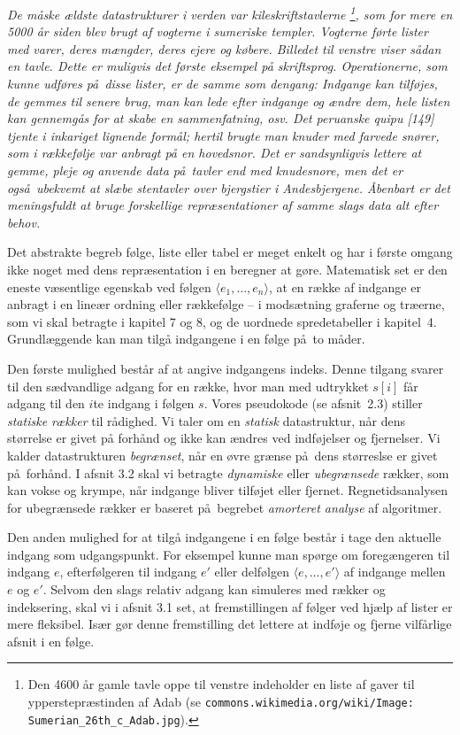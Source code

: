 \emph{De måske ældste datastrukturer i verden var kileskriftstavlerne%
\footnote{%
Den 4600 år gamle tavle oppe til venstre indeholder en liste af gaver til ypperstepræstinden af Adab (se \texttt{commons.wikimedia.org/wiki/Image: Sumerian\_26th\_c\_Adab.jpg}).
},
som for mere en 5000 år siden blev brugt af vogterne i sumeriske templer.
Vogterne førte lister med varer, deres mængder, deres ejere og købere.
Billedet til venstre viser sådan en tavle.
Dette er muligvis det første eksempel på skriftsprog.
Operationerne, som kunne udføres på disse lister, er de samme som dengang:
Indgange kan tilføjes, de gemmes til senere brug, man kan lede efter indgange og ændre dem, hele listen kan gennemgås for at skabe en sammenfatning, osv.
Det peruanske quipu [149] tjente i inkariget lignende formål;
hertil brugte man knuder med farvede snører, som i rækkefølje var anbragt på en hovedsnor.
Det er sandsynligvis lettere at gemme, pleje og anvende data på tavler end med knudesnore, men det er også ubekvemt at slæbe stentavler over bjergstier i Andesbjergene.
Åbenbart er det meningsfuldt at bruge forskellige repræsentationer af samme slags data alt efter behov.
}

\bigskip

Det abstrakte begreb følge, liste eller tabel er meget enkelt og har i første omgang ikke noget med dens repræsentation i en beregner at gøre.
Matematisk set er den eneste væsentlige egenskab ved følgen $\langle e_1,\ldots, e_n\rangle$, at en række af indgange er anbragt i en lineær ordning eller rækkefølge -- i modsætning graferne og træerne, som vi skal betragte i kapitel 7 og 8, og de uordnede spredetabeller i kapitel~4.
Grundlæggende kan man tilgå indgangene i en følge på to måder.

Den første mulighed består af at angive indgangens indeks.
Denne tilgang svarer til den sædvandlige adgang for en række, hvor man med udtrykket $s[i]$ får adgang til den $i$te indgang i følgen $s$.
Vores pseudokode (se afsnit~2.3) stiller \emph{statiske rækker} til rådighed.
Vi taler om en \emph{statisk} datastruktur, når dens størrelse er givet på forhånd og ikke kan ændres ved indføjelser og fjernelser.
Vi kalder datastrukturen \emph{begrænset}, når en øvre grænse på dens størreslse er givet på forhånd.
I afsnit 3.2 skal vi betragte \emph{dynamiske} eller \emph{ubegrænsede} rækker, som kan vokse og krympe, når indgange bliver tilføjet eller fjernet.
Regnetidsanalysen for ubegrænsede rækker er baseret på begrebet \emph{amorteret analyse} af algoritmer.

Den anden mulighed for at tilgå indgangene i en følge består i tage den aktuelle indgang som udgangspunkt.
For eksempel kunne man spørge om foregængeren til indgang $e$, efterfølgeren til indgang $e'$ eller delfølgen $\langle e,\ldots, e'\rangle$ af indgange mellen $e$ og $e'$.
Selvom den slags relativ adgang kan simuleres med rækker og indeksering, skal vi i afsnit 3.1 set, at fremstillingen af følger ved hjælp af lister er mere fleksibel.
Især gør denne fremstilling det lettere at indføje og fjerne vilfårlige afsnit i en følge.

